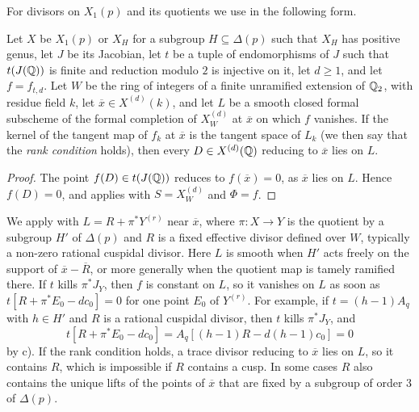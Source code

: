 For divisors on $X_1(p)$ and its quotients we use  in the following form.

\begin{lemma}\label{lem:relD}
Let $X$ be $X_1(p)$ or $X_H$ for a subgroup $H\subseteq\Delta(p)$ such that $X_H$ has positive genus, let $J$ be its Jacobian, let $t$ be a tuple of endomorphisms of $J$ such that $t(J(\mathbb{Q}))$ is finite and reduction modulo $2$ is injective on it, let $d\geq1$, and let $f=f_{t,d}$. Let $W$ be the ring of integers of a finite unramified extension of $\mathbb{Q}_2$, with residue field $k$, let $\overline x\in X^{(d)}(k)$, and let $L$ be a smooth closed formal subscheme of the formal completion of $X^{(d)}_W$ at $\overline x$ on which $f$ vanishes. If the kernel of the tangent map of $f_k$ at $\overline x$ is the tangent space of $L_k$ (we then say that the \textit{rank condition} holds), then every $D\in X^{(d)}(\mathbb{Q})$ reducing to $\overline x$ lies on $L$.
\end{lemma}

\begin{proof}
The point $f(D)\in t(J(\mathbb{Q}))$ reduces to $f(\overline x)=0$, as $\overline x$ lies on $L$. Hence $f(D)=0$, and  applies with $S=X^{(d)}_W$ and $\Phi=f$.
\end{proof}

We apply  with $L=R+\pi^*Y^{(r)}$ near $\overline x$, where $\pi:X\to Y$ is the quotient by a subgroup $H'$ of $\Delta(p)$ and $R$ is a fixed effective divisor defined over $W$, typically a non-zero rational cuspidal divisor. Here $L$ is smooth when $H'$ acts freely on the support of $\overline x-\overline R$, or more generally when the quotient map is tamely ramified there. If $t$ kills $\pi^*J_Y$, then $f$ is constant on $L$, so it vanishes on $L$ as soon as $t[R+\pi^*E_0-dc_0]=0$ for one point $E_0$ of $Y^{(r)}$. For example, if $t=(h-1)A_q$ with $h\in H'$ and $R$ is a rational cuspidal divisor, then $t$ kills $\pi^*J_Y$, and
$$t[R+\pi^*E_0-dc_0]=A_q[(h-1)R-d(h-1)c_0]=0$$
by  c). If the rank condition holds, a trace divisor reducing to $\overline x$ lies on $L$, so it contains $R$, which is impossible if $R$ contains a cusp. In some cases $R$ also contains the unique lifts of the points of $\overline x$ that are fixed by a subgroup of order $3$ of $\Delta(p)$.

